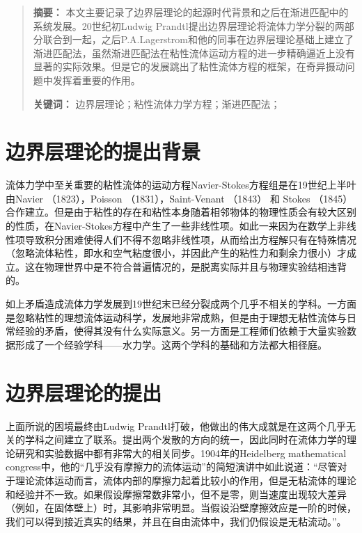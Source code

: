 \begin{abstract}
  \noindent \textbf{摘要：}  本文主要记录了边界层理论的起源时代背景和之后在渐进匹配中的系统发展。20世纪初Ludwig Prandtl提出边界层理论将流体力学分裂的两部分联合到一起，之后P.A.Lagerstrom和他的同事在边界层理论基础上建立了渐进匹配法，虽然渐进匹配法在粘性流体运动方程的进一步精确逼近上没有显著的实际效果。但是它的发展跳出了粘性流体方程的框架，在奇异摄动问题中发挥着重要的作用。\par\noindent \textbf{关键词：}  边界层理论；粘性流体力学方程；渐进匹配法；
\end{abstract}
\setcounter{section}{0}
\section{边界层理论的提出背景} %
\label{sec:背景介绍}
    流体力学中至关重要的粘性流体的运动方程Navier-Stokes方程组是在19世纪上半叶由Navier （1823），Poisson （1831），Saint-Venant （1843） 和 Stokes （1845）合作建立。但是由于粘性的存在和粘性本身随着相邻物体的物理性质会有较大区别的性质，在Navier-Stokes方程中产生了一些非线性项。如此一来因为在数学上非线性项导致积分困难使得人们不得不忽略非线性项，从而给出方程解只有在特殊情况（忽略流体粘性，即水和空气粘度很小，并因此产生的粘性力和剩余力很小）才成立。这在物理世界中是不符合普遍情况的，是脱离实际并且与物理实验结相违背的\cite{Tani1977}。\par
    
    如上矛盾造成流体力学发展到19世纪末已经分裂成两个几乎不相关的学科。一方面是忽略粘性的理想流体运动科学，发展地非常成熟，但是由于理想无粘性流体与日常经验的矛盾，使得其没有什么实际意义。另一方面是工程师们依赖于大量实验数据形成了一个经验学科——水力学。这两个学科的基础和方法都大相径庭。

	\section{边界层理论的提出} %
	\label{sec:国内外研究现状}

    上面所说的困境最终由Ludwig Prandtl打破，他做出的伟大成就是在这两个几乎无关的学科之间建立了联系。提出两个发散的方向的统一，因此同时在流体力学的理论研究和实验数据中都有非常大的相关同步。1904年的Heidelberg mathematical congress中，他的“几乎没有摩擦力的流体运动”的简短演讲中如此说道：“尽管对于理论流体运动而言，流体内部的摩擦力起着比较小的作用，但是无粘流体的理论和经验并不一致。如果假设摩擦常数非常小，但不是零，则当速度出现较大差异（例如，在固体壁上）时，其影响非常明显。当假设沿壁摩擦效应是一阶的时候，我们可以得到接近真实的结果，并且在自由流体中，我们仍假设是无粘流动\cite{Eckert2019}。”。

